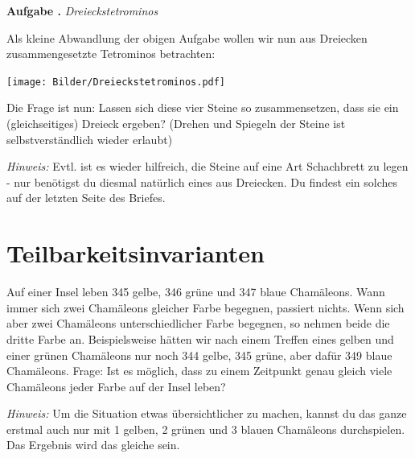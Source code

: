 \documentclass[a4paper,ngerman,12pt]{scrartcl}
\theoremstyle{definition}
\theoremstyle{plain}
\theoremstyle{remark}
\newlength{\aufgabenskip}
\newcounter{aufgabennummer}
\newenvironment{aufgabe}[1]{
	\addtocounter{aufgabennummer}{1}
	\textbf{Aufgabe \theaufgabennummer.} \emph{#1} \par
}{\vspace{\aufgabenskip}}
\begin{document}
\begin{aufgabe}{Dreieckstetrominos}
	Als kleine Abwandlung der obigen Aufgabe wollen wir nun aus Dreiecken zusammengesetzte \glqq Tetrominos\grqq{} betrachten:
	\begin{center}
		\texttt{[image: Bilder/Dreieckstetrominos.pdf]}
	\end{center}
	Die Frage ist nun: Lassen sich diese vier Steine so zusammensetzen, dass sie ein (gleichseitiges) Dreieck ergeben? (Drehen und Spiegeln der Steine ist selbstverständlich wieder erlaubt)
	
	\emph{Hinweis:} Evtl. ist es wieder hilfreich, die Steine auf eine Art \glqq Schachbrett\grqq{} zu legen - nur benötigst du diesmal natürlich eines aus Dreiecken. Du findest ein solches auf der letzten Seite des Briefes.
\end{aufgabe}


\section{Teilbarkeitsinvarianten}

Auf einer Insel leben 345 gelbe, 346 grüne und 347 blaue Chamäleons. Wann immer sich zwei Chamäleons gleicher Farbe begegnen, passiert nichts. Wenn sich aber zwei Chamäleons unterschiedlicher Farbe begegnen, so nehmen beide die dritte Farbe an. Beispielsweise hätten wir nach einem Treffen eines gelben und einer grünen Chamäleons nur noch 344 gelbe, 345 grüne, aber dafür 349 blaue Chamäleons. Frage: Ist es möglich, dass zu einem Zeitpunkt genau gleich viele Chamäleons jeder Farbe auf der Insel leben?

\emph{Hinweis:} Um die Situation etwas übersichtlicher zu machen, kannst du das ganze erstmal auch nur mit 1 gelben, 2 grünen und 3 blauen Chamäleons durchspielen. Das Ergebnis wird das gleiche sein.
\end{document}

